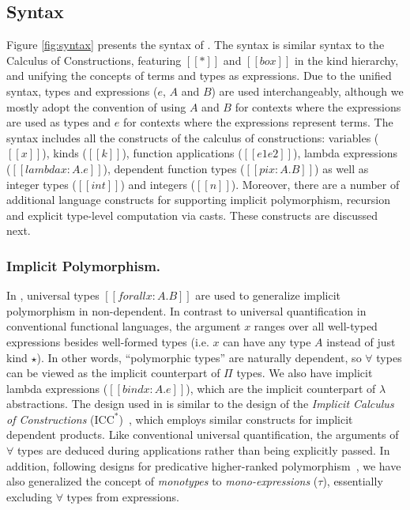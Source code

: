 \subsection{Syntax}

Figure \ref{fig:syntax} presents the syntax of \name. The syntax is similar
syntax to the Calculus of Constructions, featuring
$[[*]]$ and $[[box]]$ in the kind hierarchy, and unifying the concepts of terms
and types as expressions. Due to the unified syntax, types and
expressions ($e$, $A$ and $B$) are used
interchangeably, although we mostly adopt the convention of using $A$ and $B$
for contexts where the expressions are used as types and $e$ for contexts
where the expressions represent terms.
The syntax includes all the constructs of the calculus of constructions:
variables ($[[x]]$), kinds ($[[k]]$), function applications  ($[[e1 e2]]$),
lambda expressions ($[[lambda x : A. e]]$), dependent function types ($[[pi x : A. B]]$)
as well as integer types ($[[int]]$) and integers ($[[n]]$).
Moreover, there are a number of additional language constructs for
supporting implicit polymorphism, recursion and explicit type-level computation
via casts. These constructs are discussed next.

\subsubsection{Implicit Polymorphism.}
In \name, universal types $[[forall x : A. B]]$ are used to generalize implicit
polymorphism in non-dependent. 
In contrast to universal quantification in conventional functional languages, the
argument $x$ ranges over all well-typed expressions besides well-formed
types (i.e. $x$ can have any type $A$ instead of just kind $\star$).
In other words, ``polymorphic types'' are naturally dependent, so $\forall$
types can be viewed as the implicit counterpart of $\Pi$ types. We also have
implicit lambda expressions ($[[bind x : A. e]]$), which are the implicit counterpart of
  $\lambda$ abstractions. The design used in \name
  is similar to the design of the \emph{Implicit Calculus of Constructions} ($\text{ICC}^*$)~\cite{barras2008implicit}, which
  employs similar constructs for implicit dependent products.
Like conventional universal quantification, the arguments of $\forall$ types are
deduced during applications rather than being explicitly passed.
In addition, following designs for predicative higher-ranked polymorphism~\cite{oderskylufer,DK,PJ}, we have also generalized the concept of \emph{monotypes} to
\emph{mono-expressions} ($\tau$), essentially excluding $\forall$ types from expressions.

